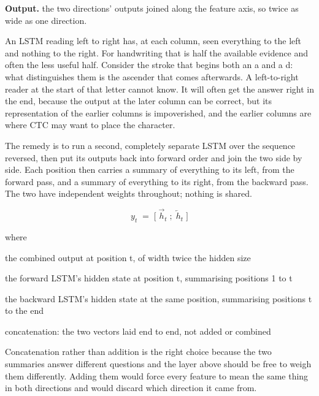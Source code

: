 \noindent\textbf{Output.} the two directions' outputs joined along the feature axis, so twice as wide as one direction.


An LSTM reading left to right has, at each column, seen everything to the left and nothing to the right. For handwriting that is half the available evidence and often the less useful half. Consider the stroke that begins both an a and a d: what distinguishes them is the ascender that comes afterwards. A left-to-right reader at the start of that letter cannot know. It will often get the answer right in the end, because the output at the later column can be correct, but its representation of the earlier columns is impoverished, and the earlier columns are where CTC may want to place the character.


The remedy is to run a second, completely separate LSTM over the sequence reversed, then put its outputs back into forward order and join the two side by side. Each position then carries a summary of everything to its left, from the forward pass, and a summary of everything to its right, from the backward pass. The two have independent weights throughout; nothing is shared.


\begin{equation}
y_t \;=\; \big[\; \overrightarrow{h}_t \;;\; \overleftarrow{h}_t \;\big]
\end{equation}

\noindent where
\begin{description}[leftmargin=2.4em,style=nextline,font=\normalfont\ttfamily]\setlength\itemsep{1pt}
  \item[{$y_t$}] \normalfont the combined output at position t, of width twice the hidden size
  \item[{$\overrightarrow{h}_t$}] \normalfont the forward LSTM's hidden state at position t, summarising positions 1 to t
  \item[{$\overleftarrow{h}_t$}] \normalfont the backward LSTM's hidden state at the same position, summarising positions t to the end
  \item[{$[\;\cdot\;;\;\cdot\;]$}] \normalfont concatenation: the two vectors laid end to end, not added or combined
\end{description}
Concatenation rather than addition is the right choice because the two summaries answer different questions and the layer above should be free to weigh them differently. Adding them would force every feature to mean the same thing in both directions and would discard which direction it came from.


